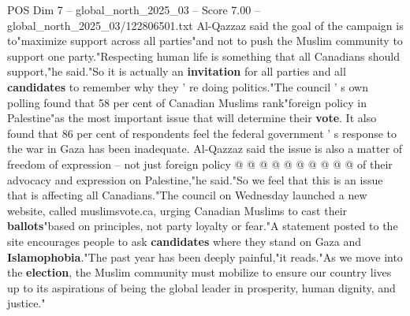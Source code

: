 \begin{textsample}{POS Dim 7 – global\_north\_2025\_03 – Score 7.00 – global\_north\_2025\_03/122806501.txt}
Al-Qazzaz said the goal of the campaign is to"maximize support across all parties"and not to push the Muslim community to support one party."Respecting human life is something that all Canadians should support,"he said."So it is actually an \textbf{invitation} for all parties and all \textbf{candidates} to remember why they ' re doing politics."The council ' s own polling found that 58 per cent of Canadian Muslims rank"foreign policy in Palestine"as the most important issue that will determine their \textbf{vote}.
It also found that 86 per cent of respondents feel the federal government ' s response to the war in Gaza has been inadequate.
Al-Qazzaz said the issue is also a matter of freedom of expression -- not just foreign policy @ @ @ @ @ @ @ @ @ @ of their advocacy and expression on Palestine,"he said."So we feel that this is an issue that is affecting all Canadians."The council on Wednesday launched a new website, called muslimsvote.ca, urging Canadian Muslims to cast their \textbf{ballots}"based on principles, not party loyalty or fear."A statement posted to the site encourages people to ask \textbf{candidates} where they stand on Gaza and \textbf{Islamophobia}."The past year has been deeply painful,"it reads."As we move into the \textbf{election}, the Muslim community must mobilize to ensure our country lives up to its aspirations of being the global leader in prosperity, human dignity, and justice."

\end{textsample}
